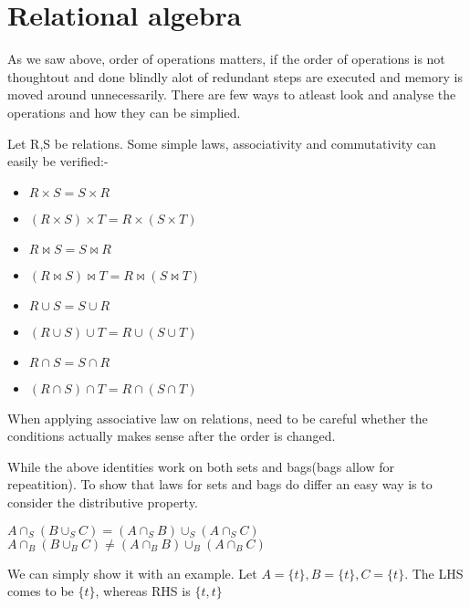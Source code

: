 \section{Relational algebra}
As we saw above, order of operations matters, if the order of operations is not thoughtout and done blindly alot of redundant steps are executed and memory is moved around unnecessarily. There are few ways to atleast look and analyse the operations and how they can be simplied.
\par Let \textsc{R,S} be relations. Some simple laws, associativity and commutativity can easily be verified:-
\begin{itemize}
    \item $R\times S = S \times R$
    \item $(R\times S) \times T = R\times (S \times T)$
    \item $R \bowtie S = S \bowtie R$
    \item $(R \bowtie S) \bowtie T = R \bowtie (S \bowtie T)$
    \item $R \cup S = S \cup R$
    \item $(R \cup S) \cup T = R \cup (S \cup T)$
    \item $R \cap S = S \cap R$
    \item $(R \cap S) \cap T = R \cap (S \cap T)$
\end{itemize}
When applying associative law on relations, need to be careful whether the conditions actually makes sense after the order is changed.
\par While the above identities work on both sets and bags(bags allow for repeatition). To show that laws for sets and bags do differ an easy way is to consider the distributive property.
\begin{center}
$A\cap _S(B\cup_S C) = (A\cap_S B)\cup_S(A\cap_S C)$\\
$A\cap _B(B\cup_B C) \neq (A\cap_B B)\cup_B(A\cap_B C)$
\end{center}
We can simply show it with an example. Let $A=\{t\},B=\{t\},C=\{t\}$. The LHS comes to be $\{t\}$, whereas RHS is $\{t,t\}$

